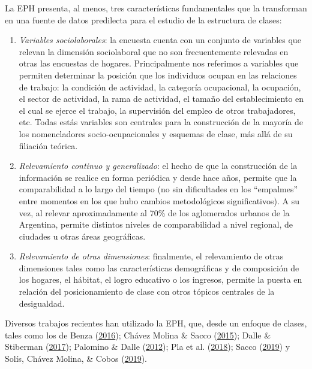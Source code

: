 \documentclass[
]{article}
\begin{document}
La EPH presenta, al menos, tres características fundamentales que la transforman en una fuente de datos predilecta para el estudio de la estructura de clases:

\begin{enumerate}
\def\labelenumi{\arabic{enumi}.}
\item
  \emph{Variables sociolaborales}: la encuesta cuenta con un conjunto de variables que relevan la dimensión sociolaboral que no son frecuentemente relevadas en otras las encuestas de hogares. Principalmente nos referimos a variables que permiten determinar la posición que los individuos ocupan en las relaciones de trabajo: la condición de actividad, la categoría ocupacional, la ocupación, el sector de actividad, la rama de actividad, el tamaño del establecimiento en el cual se ejerce el trabajo, la supervisión del empleo de otros trabajadores, etc. Todas estás variables son centrales para la construcción de la mayoría de los nomencladores socio-ocupacionales y esquemas de clase, más allá de su filiación teórica.
\item
  \emph{Relevamiento continuo y generalizado}: el hecho de que la construcción de la información se realice en forma periódica y desde hace años, permite que la comparabilidad a lo largo del tiempo (no sin dificultades en los ``empalmes'' entre momentos en los que hubo cambios metodológicos significativos). A su vez, al relevar aproximadamente al 70\% de los aglomerados urbanos de la Argentina, permite distintos niveles de comparabilidad a nivel regional, de ciudades u otras áreas geográficas.
\item
  \emph{Relevamiento de otras dimensiones}: finalmente, el relevamiento de otras dimensiones tales como las características demográficas y de composición de los hogares, el hábitat, el logro educativo o los ingresos, permite la puesta en relación del posicionamiento de clase con otros tópicos centrales de la desigualdad.
\end{enumerate}

Diversos trabajos recientes han utilizado la EPH, que, desde un enfoque de clases, tales como los de Benza (\protect\hyperlink{ref-Benza2016}{2016}); Chávez Molina \& Sacco (\protect\hyperlink{ref-ChavezMolina2015}{2015}); Dalle \& Stiberman (\protect\hyperlink{ref-Dalle.Stiberman2017}{2017}); Palomino \& Dalle (\protect\hyperlink{ref-Palomino.Dalle2012}{2012}); Pla et al. (\protect\hyperlink{ref-Pla.etal2018}{2018}); Sacco (\protect\hyperlink{ref-Sacco2019}{2019}) y Solís, Chávez Molina, \& Cobos (\protect\hyperlink{ref-Solis.etal2019}{2019}).
\end{document}
